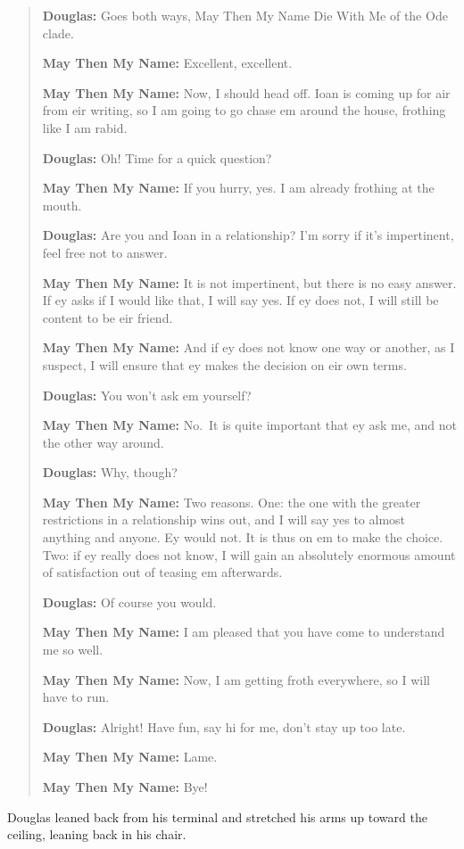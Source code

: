 \begin{quote}
\textbf{Douglas:} Goes both ways, May Then My Name Die With Me of the Ode clade.

\textbf{May Then My Name:} Excellent, excellent.

\textbf{May Then My Name:} Now, I should head off. Ioan is coming up for air from eir writing, so I am going to go chase em around the house, frothing like I am rabid.

\textbf{Douglas:} Oh! Time for a quick question?

\textbf{May Then My Name:} If you hurry, yes. I am already frothing at the mouth.

\textbf{Douglas:} Are you and Ioan in a relationship? I'm sorry if it's impertinent, feel free not to answer.

\textbf{May Then My Name:} It is not impertinent, but there is no easy answer. If ey asks if I would like that, I will say yes. If ey does not, I will still be content to be eir friend.

\textbf{May Then My Name:} And if ey does not know one way or another, as I suspect, I will ensure that ey makes the decision on eir own terms.

\textbf{Douglas:} You won't ask em yourself?

\textbf{May Then My Name:} No.~It is quite important that ey ask me, and not the other way around.

\textbf{Douglas:} Why, though?

\textbf{May Then My Name:} Two reasons. One: the one with the greater restrictions in a relationship wins out, and I will say yes to almost anything and anyone. Ey would not. It is thus on em to make the choice. Two: if ey really does not know, I will gain an absolutely enormous amount of satisfaction out of teasing em afterwards.

\textbf{Douglas:} Of course you would.

\textbf{May Then My Name:} I am pleased that you have come to understand me so well.

\textbf{May Then My Name:} Now, I am getting froth everywhere, so I will have to run.

\textbf{Douglas:} Alright! Have fun, say hi for me, don't stay up too late.

\textbf{May Then My Name:} Lame.

\textbf{May Then My Name:} Bye!
\end{quote}

\noindent Douglas leaned back from his terminal and stretched his arms up toward the ceiling, leaning back in his chair.

